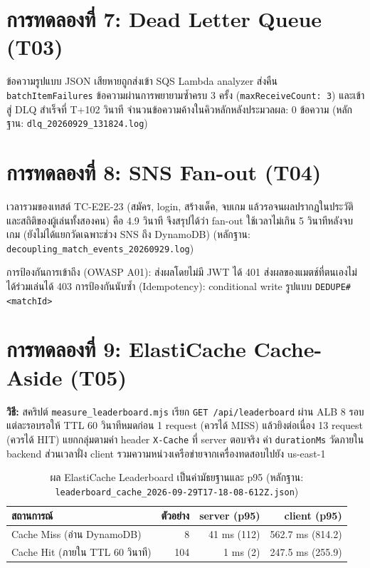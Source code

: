 \documentclass[12pt,a4paper]{report}
\begin{document}
\section{การทดลองที่ 7: Dead Letter Queue (T03)}

ข้อความรูปแบบ JSON เสียหายถูกส่งเข้า SQS Lambda analyzer ส่งคืน \texttt{batchItemFailures} ข้อความผ่านการพยายามซ้ำครบ 3 ครั้ง (\texttt{maxReceiveCount: 3}) และเข้าสู่ DLQ สำเร็จที่ T+102 วินาที จำนวนข้อความค้างในคิวหลักหลังประมวลผล: 0 ข้อความ (หลักฐาน: \texttt{dlq\_20260929\_131824.log})

\section{การทดลองที่ 8: SNS Fan-out (T04)}

เวลารวมของเทสต์ TC-E2E-23 (สมัคร, login, สร้างเด็ค, จบเกม แล้วรอจนผลปรากฏในประวัติและสถิติของผู้เล่นทั้งสองคน) คือ 4.9 วินาที จึงสรุปได้ว่า fan-out ใช้เวลาไม่เกิน 5 วินาทีหลังจบเกม (ยังไม่ได้แยกวัดเฉพาะช่วง SNS ถึง DynamoDB) (หลักฐาน: \nolinkurl{decoupling_match_events_20260929.log})

การป้องกันการเข้าถึง (OWASP A01): ส่งผลโดยไม่มี JWT ได้ 401 ส่งผลของแมตช์ที่ตนเองไม่ได้ร่วมเล่นได้ 403 การป้องกันนับซ้ำ (Idempotency): conditional write รูปแบบ \texttt{DEDUPE\#<matchId>}

\section{การทดลองที่ 9: ElastiCache Cache-Aside (T05)}

\textbf{วิธี:} สคริปต์ \texttt{measure\_leaderboard.mjs} เรียก \texttt{GET /api/leaderboard} ผ่าน ALB 8 รอบ แต่ละรอบรอให้ TTL 60 วินาทีหมดก่อน 1 request (ควรได้ MISS) แล้วยิงต่อเนื่อง 13 request (ควรได้ HIT) แยกกลุ่มตามค่า header \texttt{X-Cache} ที่ server ตอบจริง ค่า \texttt{durationMs} วัดภายใน backend ส่วนเวลาฝั่ง client รวมความหน่วงเครือข่ายจากเครื่องทดสอบไปยัง us-east-1

\begin{table}[H]
\centering
\caption{ผล ElastiCache Leaderboard เป็นค่ามัธยฐานและ p95 (หลักฐาน: \nolinkurl{leaderboard_cache_2026-09-29T17-18-08-612Z.json})}
\begin{tabularx}{\textwidth}{Xrrr}
\toprule
\textbf{สถานการณ์} & \textbf{ตัวอย่าง} & \textbf{server (p95)} & \textbf{client (p95)} \\
\midrule
Cache Miss (อ่าน DynamoDB) & 8 & 41 ms (112) & 562.7 ms (814.2) \\
Cache Hit (ภายใน TTL 60 วินาที) & 104 & 1 ms (2) & 247.5 ms (255.9) \\
\bottomrule
\end{tabularx}
\end{table}
\end{document}
